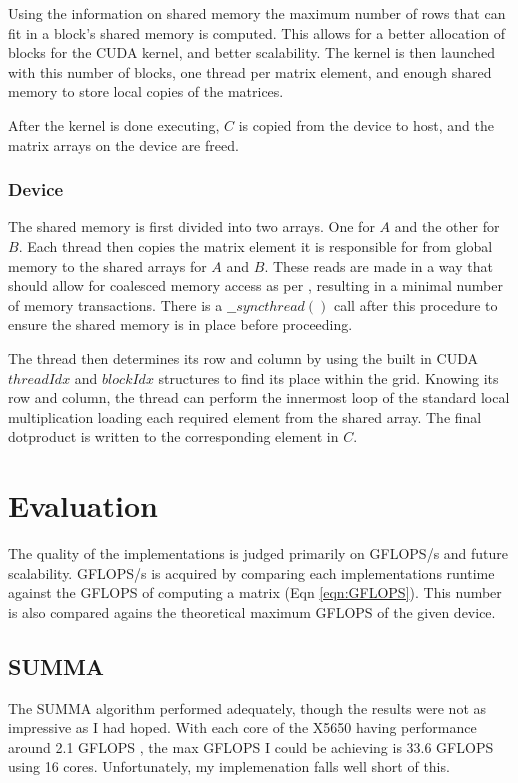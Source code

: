 \documentclass[11pt, twocolumn]{article}
\begin{document}
Using the information on shared memory the maximum number of rows that can fit in a block's shared memory is computed. This allows for a better allocation of blocks for the CUDA kernel, and better scalability. The kernel is then launched with this number of blocks, one thread per matrix element, and enough shared memory to store local copies of the matrices.

After the kernel is done executing, $C$ is copied from the device to host, and the matrix arrays on the device are freed.

\subsubsection{Device}
The shared memory is first divided into two arrays. One for $A$ and the other for $B$. Each thread then copies the matrix element it is responsible for from  global memory to the shared arrays for $A$ and $B$. These reads are made in a way that should allow for coalesced memory access as per \cite{CUDA_PGUIDE}, resulting in a minimal number of memory transactions. There is a $\_\_syncthread()$ call after this procedure to ensure the shared memory is in place before proceeding.

The thread then determines its row and column by using the built in CUDA $threadIdx$ and $blockIdx$ structures to find its place within the grid. Knowing its row and column, the thread can perform the innermost loop of the standard local multiplication loading each required element from the shared array. The final dotproduct is written to the corresponding element in $C$.


\section{Evaluation}
The quality of the implementations is judged primarily on GFLOPS/s and future scalability. GFLOPS/s is acquired by comparing each implementations runtime against the GFLOPS of computing a matrix (Eqn \ref{eqn:GFLOPS}). This number is also compared agains the theoretical maximum GFLOPS of the given device.

\subsection{SUMMA}
The SUMMA algorithm performed adequately, though the results were not as impressive as I had hoped. With each core of the X5650 having performance around 2.1 GFLOPS \cite{XEON_FLOPS}, the max GFLOPS I could be achieving is 33.6 GFLOPS using 16 cores. Unfortunately, my implemenation falls well short of this.
\end{document}

